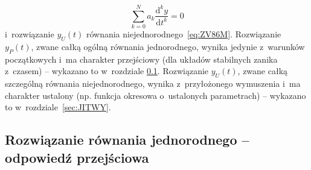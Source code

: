 \documentclass[paper=a4,DIV=12]{lpas}
\newcommand{\odn}[3]{\frac{\mathrm{d}^{#1}#2}{\mathrm{d}{#3}^{#1}}}
\begin{document}
\begin{equation}
  \sum_{k = 0}^{N} a_k \odn{k}{y}{t} = 0
  \label{eq:BHP9M}
\end{equation}
i~rozwiązanie $y_U(t)$ równania niejednorodnego~\eqref{eq:ZV86M}. Rozwiązanie
$y_P(t)$, zwane całką ogólną równania jednorodnego, wynika jedynie z~warunków
początkowych i~ma charakter przejściowy (dla układów stabilnych zanika
z~czasem) -- wykazano to w~rozdziale \ref{sec:ZFKPA}. Rozwiązanie $y_U(t)$,
zwane całką szczególną równania niejednorodnego, wynika z~przyłożonego
wymuszenia i~ma charakter ustalony (np. funkcja okresowa o~ustalonych
parametrach) -- wykazano to w~rozdziale~\ref{sec:JITWY}.

\subsection{Rozwiązanie równania jednorodnego -- odpowiedź przejściowa}
\label{sec:ZFKPA}
\end{document}
